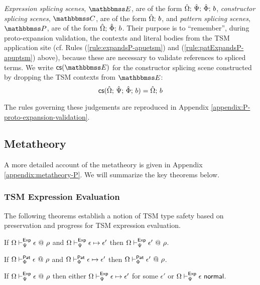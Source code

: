 \emph{Expression splicing scenes}, $\escenev$, are of the form ${\hat\Omega};\,\hat{\Psi};\,\hat\Phi;\,b$, \emph{constructor splicing scenes}, $\cscenev$, are of the form ${\hat\Omega};\,b$, and \emph{pattern splicing scenes}, $\pscenev$, are of the form ${\hat\Omega};\,\hat\Phi;\,b$. Their purpose is to ``remember'', during proto-expansion validation, the contexts and literal bodies from the TSM application site (cf. Rules (\ref{rule:expandsP-apuetsm}) and (\ref{rule:patExpandsP-apuptsm}) above), because these are necessary to validate references to spliced terms. We write $\csfrom{\escenev}$ for the constructor splicing scene constructed by dropping the TSM contexts from $\escenev$:
\[\mathsf{cs}({\hat\Omega};\,\hat{\Psi};\,\hat\Phi;\,b) = {\hat\Omega};\,b\]

The rules governing these judgements are reproduced in Appendix \ref{appendix:P-proto-expansion-validation}.

\subsection{Metatheory}
A more detailed account of the metatheory is given in Appendix \ref{appendix:metatheory-P}. We will summarize the key theorems below.

\subsubsection{TSM Expression Evaluation}
The following theorems establish a notion of TSM type safety based on preservation and progress for TSM expression evaluation.

\begingroup
\def\thetheorem{\ref{thm:peTSM-preservation}}
\begin{theorem}
If $\Omega \vdash_{\Psi}^{\mathsf{Exp}} \epsilon ~@~ \rho$ and $\Omega \vdash_{\Psi}^\mathsf{Exp} \epsilon \mapsto \epsilon'$ then $\Omega \vdash_{\Psi}^{\mathsf{Exp}} \epsilon' ~@~ \rho$.
\end{theorem}
\endgroup

\begingroup
\def\thetheorem{\ref{thm:ppTSM-preservation}}
\begin{theorem}
If $\Omega \vdash_{\Phi}^{\mathsf{Pat}} \epsilon ~@~ \rho$ and $\Omega \vdash_{\Phi}^\mathsf{Pat} \epsilon \mapsto \epsilon'$ then $\Omega \vdash_{\Phi}^{\mathsf{Pat}} \epsilon' ~@~ \rho$.
\end{theorem}
\endgroup

\begingroup
\def\thetheorem{\ref{thm:peTSM-progress}}
\begin{theorem}
If $\Omega \vdash_{\Psi}^{\mathsf{Exp}} \epsilon ~@~ \rho$ then either $\Omega \vdash_{\Psi}^\mathsf{Exp} \epsilon \mapsto \epsilon'$ for some $\epsilon'$ or $\Omega \vdash_{\Psi}^\mathsf{Exp} \epsilon~\mathsf{normal}$.
\end{theorem}
\endgroup

